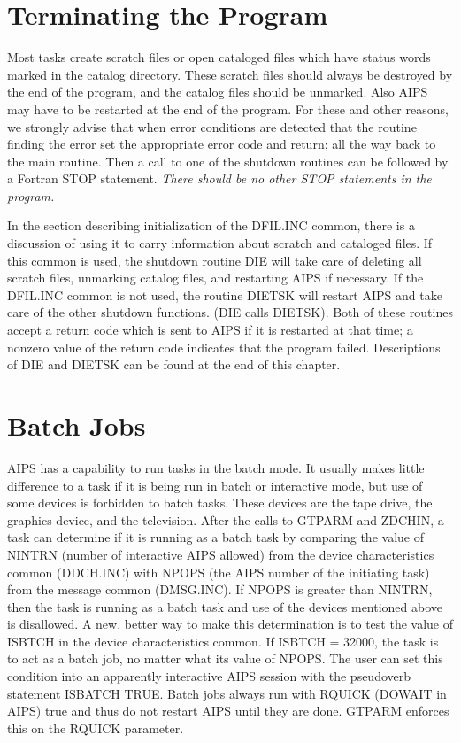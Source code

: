 \section{Terminating the Program}
 Most tasks create scratch files or open cataloged  files which have
status words marked in the catalog directory.  These scratch files
should always be destroyed by the end of the program, and the catalog
files should be unmarked.  Also AIPS may have to be restarted at the
end of the program.  For these and other reasons, we strongly advise
that when error conditions are detected that the routine finding the
error set the appropriate error code and return; all the way back to
the main routine.  Then a call to one of the shutdown routines can be
followed by a Fortran STOP statement.  {\it There should be no other
STOP statements in the program.}

In the section describing initialization of the DFIL.INC common, there
is a discussion of using it to carry information about scratch and
cataloged files.  If this common is used, the shutdown routine DIE
will take care of deleting all scratch files, unmarking catalog files,
and restarting AIPS if necessary.  If the DFIL.INC common is not used,
the routine DIETSK will restart AIPS and take care of the other
shutdown functions.  (DIE calls DIETSK).  Both of these routines
accept a return code which is sent to AIPS if it is restarted at that
time; a nonzero value of the return code indicates that the program
failed. Descriptions of DIE and DIETSK can be found at the end of this
chapter.

\section{Batch Jobs}
 AIPS has a capability to run tasks in the batch mode.  It usually
makes little difference to a task if it is being run in batch or
interactive mode, but use of some devices is forbidden to batch tasks.
These devices are the tape drive, the graphics device, and the
television.  After the calls to GTPARM and ZDCHIN, a task can
determine if it is running as a batch task by comparing the value of
NINTRN (number of interactive AIPS allowed) from the device
characteristics common (DDCH.INC) with NPOPS (the AIPS
number of the initiating task) from the message common (DMSG.INC).
If NPOPS is greater than NINTRN, then the task is running
as a batch task and use of the devices mentioned above is disallowed.
A new, better way to make this determination is to test the value of
ISBTCH in the device characteristics common.  If ISBTCH = 32000, the
task is to act as a batch job, no matter what its value of NPOPS. The
user can set this condition into an apparently interactive AIPS
session with the pseudoverb statement ISBATCH TRUE. Batch jobs always
run with RQUICK (DOWAIT in AIPS) true and thus do not restart AIPS
until they are done.  GTPARM enforces this on the RQUICK parameter.

